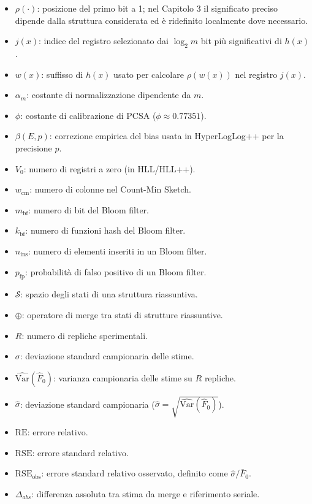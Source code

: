 \begin{itemize}
    \item $\rho(\cdot)$: posizione del primo bit a 1; nel Capitolo 3 il significato preciso dipende dalla struttura considerata ed è ridefinito localmente dove necessario.
    \item $j(x)$: indice del registro selezionato dai $\log_2 m$ bit più significativi di $h(x)$.
    \item $w(x)$: suffisso di $h(x)$ usato per calcolare $\rho(w(x))$ nel registro $j(x)$.
    \item $\alpha_m$: costante di normalizzazione dipendente da $m$.
    \item $\phi$: costante di calibrazione di PCSA ($\phi\approx 0.77351$).
    \item $\beta(E,p)$: correzione empirica del bias usata in HyperLogLog++ per la precisione $p$.
    \item $V_0$: numero di registri a zero (in HLL/HLL++).
    \item $w_{\text{cm}}$: numero di colonne nel Count-Min Sketch.
    \item $m_{\text{bf}}$: numero di bit del Bloom filter.
    \item $k_{\text{bf}}$: numero di funzioni hash del Bloom filter.
    \item $n_{\text{ins}}$: numero di elementi inseriti in un Bloom filter.
    \item $p_{\text{fp}}$: probabilità di falso positivo di un Bloom filter.
    \item $\mathcal{S}$: spazio degli stati di una struttura riassuntiva.
    \item $\oplus$: operatore di merge tra stati di strutture riassuntive.
    \item $R$: numero di repliche sperimentali.
    \item $\sigma$: deviazione standard campionaria delle stime.
    \item $\widehat{\mathrm{Var}}(\hat{F}_0)$: varianza campionaria delle stime su $R$ repliche.
    \item $\widehat{\sigma}$: deviazione standard campionaria (\(\widehat{\sigma}=\sqrt{\widehat{\mathrm{Var}}(\hat{F}_0)}\)).
    \item $\mathrm{RE}$: errore relativo.
    \item $\mathrm{RSE}$: errore standard relativo.
    \item $\mathrm{RSE}_{\text{obs}}$: errore standard relativo osservato, definito come \(\widehat{\sigma}/\bar{F}_0\).
    \item $\Delta_{abs}$: differenza assoluta tra stima da merge e riferimento seriale.

\end{itemize}
